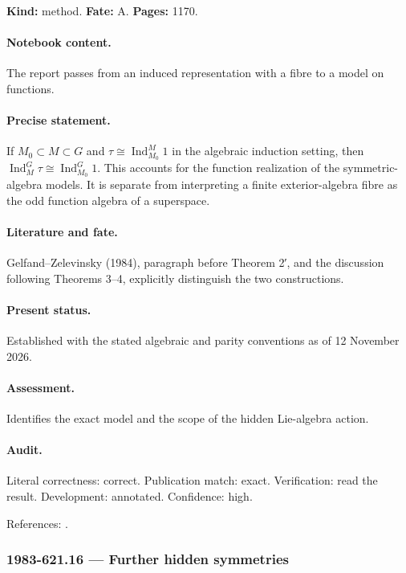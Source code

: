 \noindent\textbf{Kind:} method. \textbf{Fate:} A. \textbf{Pages:} 1170.\par

\paragraph{Notebook content.} The report passes from an induced representation with a fibre to a model on functions.

\paragraph{Precise statement.} If \(M_0\subset M\subset G\) and \(\tau\cong\operatorname{Ind}_{M_0}^{M}1\) in the algebraic induction setting, then \(\operatorname{Ind}_{M}^{G}\tau\cong\operatorname{Ind}_{M_0}^{G}1\). This accounts for the function realization of the symmetric-algebra models. It is separate from interpreting a finite exterior-algebra fibre as the odd function algebra of a superspace.

\paragraph{Literature and fate.} Gelfand–Zelevinsky (1984), paragraph before Theorem 2′, and the discussion following Theorems 3–4, explicitly distinguish the two constructions.

\paragraph{Present status.} Established with the stated algebraic and parity conventions as of 12 November 2026.

\paragraph{Assessment.} Identifies the exact model and the scope of the hidden Lie-algebra action.

\paragraph{Audit.} Literal correctness: correct. Publication match: exact. Verification: read the result. Development: annotated. Confidence: high.

\noindent References: \citep{gelfandzelevinsky1984models}.\par

\subsubsection{1983-621.16 --- Further hidden symmetries}

